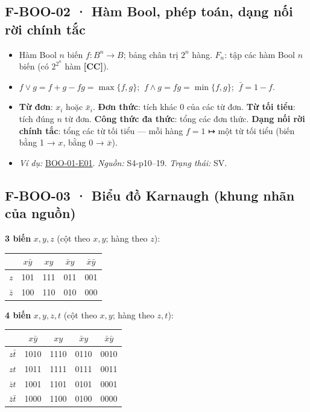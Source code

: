 \documentclass[
  10pt,
  twoside,openany]{book}
\providecommand{\tightlist}{%
  \setlength{\itemsep}{0pt}\setlength{\parskip}{0pt}}
\begin{document}
\hypertarget{F-BOO-02}{%
\subsection{F-BOO-02 · Hàm Bool, phép toán, dạng nối rời chính
tắc}\label{F-BOO-02}}

\begin{itemize}
\tightlist
\item
  Hàm Bool \(n\) biến \(f:B^n\to B\); bảng chân trị \(2^n\) hàng.
  \(F_n\): tập các hàm Bool \(n\) biến (có \(2^{2^n}\) hàm
  \textbf{{[}CC{]}}).
\item
  \(f\vee g=f+g-fg=\max\{f,g\}\); \(\ f\wedge g=fg=\min\{f,g\}\);
  \(\ \bar f=1-f\).
\item
  \textbf{Từ đơn}: \(x_i\) hoặc \(\bar x_i\). \textbf{Đơn thức}: tích
  khác 0 của các từ đơn. \textbf{Từ tối tiểu}: tích đúng \(n\) từ đơn.
  \textbf{Công thức đa thức}: tổng các đơn thức. \textbf{Dạng nối rời
  chính tắc}: tổng các từ tối tiểu --- mỗi hàng \(f=1\) ↦ một từ tối
  tiểu (biến bằng 1 → \(x\), bằng 0 → \(\bar x\)).
\item
  \emph{Ví dụ:} \protect\hyperlink{BOO-01-E01}{BOO-01-E01}.
  \emph{Nguồn:} S4-p10--19. \emph{Trạng thái:} SV.
\end{itemize}

\hypertarget{F-BOO-03}{%
\subsection{F-BOO-03 · Biểu đồ Karnaugh (khung nhãn của
nguồn)}\label{F-BOO-03}}

\textbf{3 biến} \(x,y,z\) (cột theo \(x,y\); hàng theo \(z\)):

\begin{longtable}[]{@{}lcccc@{}}
\toprule\noalign{}
& \(x\bar y\) & \(xy\) & \(\bar xy\) & \(\bar x\bar y\) \\
\midrule\noalign{}
\endhead
\bottomrule\noalign{}
\endlastfoot
\(z\) & 101 & 111 & 011 & 001 \\
\(\bar z\) & 100 & 110 & 010 & 000 \\
\end{longtable}

\textbf{4 biến} \(x,y,z,t\) (cột theo \(x,y\); hàng theo \(z,t\)):

\begin{longtable}[]{@{}lcccc@{}}
\toprule\noalign{}
& \(x\bar y\) & \(xy\) & \(\bar xy\) & \(\bar x\bar y\) \\
\midrule\noalign{}
\endhead
\bottomrule\noalign{}
\endlastfoot
\(z\bar t\) & 1010 & 1110 & 0110 & 0010 \\
\(zt\) & 1011 & 1111 & 0111 & 0011 \\
\(\bar zt\) & 1001 & 1101 & 0101 & 0001 \\
\(\bar z\bar t\) & 1000 & 1100 & 0100 & 0000 \\
\end{longtable}
\end{document}
